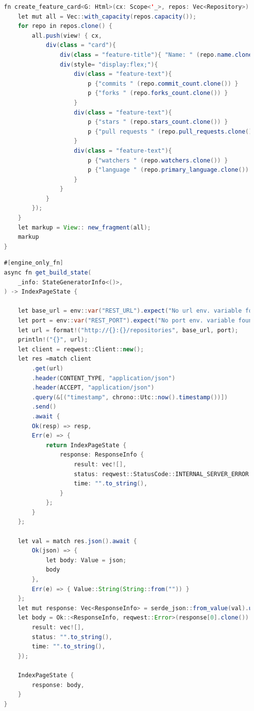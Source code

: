 \documentclass[notitlepage, hidelinks]{article}
\begin{document}
\begin{lstlisting}[language=Java,frame=single,caption=Markup im Framework Perseus/Sycamore in Rust,label=clientone]
fn create_feature_card<G: Html>(cx: Scope<'_>, repos: Vec<Repository>) -> View<G> {
    let mut all = Vec::with_capacity(repos.capacity());
    for repo in repos.clone() {
        all.push(view! { cx,
            div(class = "card"){
                div(class = "feature-title"){ "Name: " (repo.name.clone()) ", erstellt am " (repo.created_at.clone()) }
                div(style= "display:flex;"){
                    div(class = "feature-text"){
                        p {"commits " (repo.commit_count.clone()) }
                        p {"forks " (repo.forks_count.clone()) }
                    }
                    div(class = "feature-text"){
                        p {"stars " (repo.stars_count.clone()) }
                        p {"pull requests " (repo.pull_requests.clone()) }
                    }
                    div(class = "feature-text"){
                        p {"watchers " (repo.watchers.clone()) }
                        p {"language " (repo.primary_language.clone()) }
                    }
                }
            }
        });
    }
    let markup = View:: new_fragment(all);
    markup
}
\end{lstlisting}

\begin{lstlisting}[language=Java,frame=single,caption=Aufruf des Get Endpunktes für die Repositories im Client,label=clienttwo]
#[engine_only_fn]
async fn get_build_state(
    _info: StateGeneratorInfo<()>,
) -> IndexPageState {

    let base_url = env::var("REST_URL").expect("No url env. variable found");
    let port = env::var("REST_PORT").expect("No port env. variable found");
    let url = format!("http://{}:{}/repositories", base_url, port);
    println!("{}", url);
    let client = reqwest::Client::new();
    let res =match client
        .get(url)
        .header(CONTENT_TYPE, "application/json")
        .header(ACCEPT, "application/json")
        .query(&[("timestamp", chrono::Utc::now().timestamp())])
        .send()
        .await {
        Ok(resp) => resp,
        Err(e) => {
            return IndexPageState {
                response: ResponseInfo {
                    result: vec![],
                    status: reqwest::StatusCode::INTERNAL_SERVER_ERROR.to_string(),
                    time: "".to_string(),
                }
            };
        }
    };

    let val = match res.json().await {
        Ok(json) => {
            let body: Value = json;
            body
        },
        Err(e) => { Value::String(String::from("")) }
    };
    let mut response: Vec<ResponseInfo> = serde_json::from_value(val).unwrap_or(vec![]);
    let body = Ok::<ResponseInfo, reqwest::Error>(response[0].clone()).unwrap_or(ResponseInfo {
        result: vec![],
        status: "".to_string(),
        time: "".to_string(),
    });

    IndexPageState {
        response: body,
    }
}
\end{lstlisting}
\end{document}
